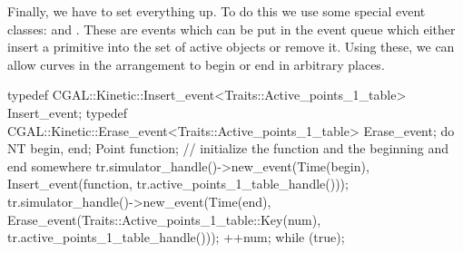 Finally, we have to set everything up. To do this we use some special
event classes:  and
. These are events which
can be put in the event queue which either insert a primitive into the
set of active objects or remove it. Using these, we can allow curves
in the arrangement to begin or end in arbitrary places.
\begin{ccExampleCode}
typedef CGAL::Kinetic::Insert_event<Traits::Active_points_1_table> Insert_event;
typedef CGAL::Kinetic::Erase_event<Traits::Active_points_1_table> Erase_event;
do {
  NT begin, end;
  Point function;
  // initialize the function and the beginning and end somewhere
  tr.simulator_handle()->new_event(Time(begin),
			      Insert_event(function, tr.active_points_1_table_handle()));
  tr.simulator_handle()->new_event(Time(end),
				      Erase_event(Traits::Active_points_1_table::Key(num),
						  tr.active_points_1_table_handle()));
  ++num;
} while (true);
\end{ccExampleCode}
